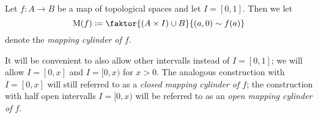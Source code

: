 \begin{definition}
    Let $f\colon A\to B$ be a map of topological spaces and let $I=[0,1]$.
    Then we let
    \begin{equation*}
        \M(f)\coloneqq\faktor{\left(A\times I\right)\cup B}{(a,0)\sim f(a)}
    \end{equation*}
    denote the \emph{mapping cylinder of $f$}.

    It will be convenient to also allow other intervalls instead of $I=[0,1]$; we will allow $I=[0,x]$ and $I=[0,x)$ for $x>0$.
    The analogous construction with $I=[0,x]$ will still referred to as a \emph{closed mapping cylinder of $f$};
    the construction with half open intervalls $I=[0,x)$ will be referred to as an \emph{open mapping cylinder of $f$}. %
\end{definition}
